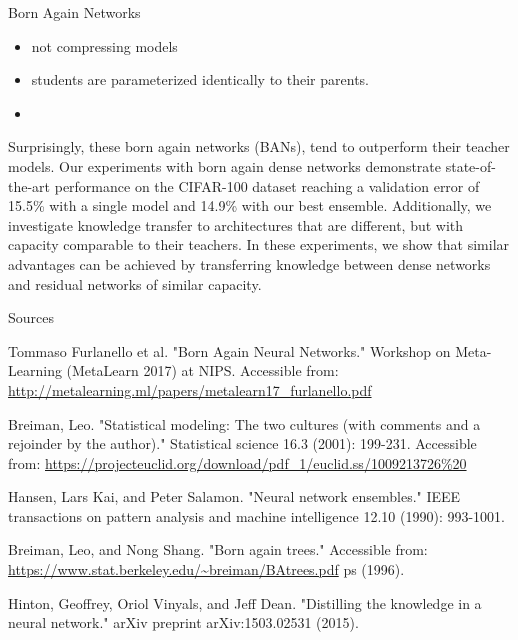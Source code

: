 \documentclass{beamer}
\begin{document}
\begin{frame}{Born Again Networks}

\begin{itemize}
\item not compressing models
\item students are parameterized identically to their parents.
\item 
\end{itemize}

  Surprisingly, these born again networks (BANs), tend to outperform their
teacher models. Our experiments with born again dense networks demonstrate
state-of-the-art performance on the CIFAR-100 dataset reaching a validation error
of 15.5\% with a single model and 14.9\% with our best ensemble. Additionally, we
investigate knowledge transfer to architectures that are different, but with capacity
comparable to their teachers. In these experiments, we show that similar advantages
can be achieved by transferring knowledge between dense networks and residual
networks of similar capacity.

\end{frame}


\begin{frame}{Sources}

\begin{thebibliography}{0}

   Tommaso Furlanello et al. "Born Again Neural Networks." Workshop on Meta-Learning (MetaLearn 2017) at NIPS. Accessible from: \url{http://metalearning.ml/papers/metalearn17_furlanello.pdf}
  
   Breiman, Leo. "Statistical modeling: The two cultures (with comments and a rejoinder by the author)." Statistical science 16.3 (2001): 199-231. Accessible from: \url{https://projecteuclid.org/download/pdf_1/euclid.ss/1009213726\%20}
  
   Hansen, Lars Kai, and Peter Salamon. "Neural network ensembles." IEEE transactions on pattern analysis and machine intelligence 12.10 (1990): 993-1001.
  
   Breiman, Leo, and Nong Shang. "Born again trees." Accessible from: \url{https://www.stat.berkeley.edu/~breiman/BAtrees.pdf} ps (1996).
  
   Hinton, Geoffrey, Oriol Vinyals, and Jeff Dean. "Distilling the knowledge in a neural network." arXiv preprint arXiv:1503.02531 (2015).
  
  
\end{thebibliography}

\end{frame}
 
 
 
\end{document}
